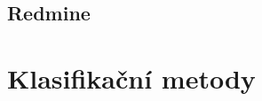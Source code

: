 \documentclass[czech,DP]{thesiskiv}
\begin{document}
\section{Redmine}








\chapter{Klasifikační metody}








 
% 
%

{\raggedright\small

}
\end{document}
